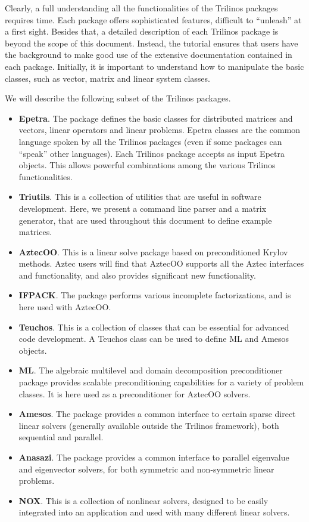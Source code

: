 Clearly, a full understanding all the functionalities of the Trilinos
packages requires time.  Each package offers sophisticated features,
difficult to ``unleash'' at a first sight.  Besides that, a detailed
description of each Trilinos package is beyond the scope of this
document. Instead, the tutorial ensures that users have the background
to make good use of the extensive documentation contained in each
package. Initially, it is important to understand how to manipulate the
basic classes, such as vector, matrix and linear system classes.

\medskip

We will describe the following subset of the Trilinos packages.
\begin{itemize} 
\item {\bf Epetra}. The package defines the basic classes for
  distributed matrices and vectors, linear operators and linear
  problems. Epetra classes are the common language spoken by all the
  Trilinos packages (even if some packages can ``speak'' other
  languages). Each Trilinos package accepts as input Epetra objects.
  This allows powerful combinations among the various Trilinos
  functionalities.
\item {\bf Triutils}. This is a collection of utilities that are useful
  in software development. Here, we present a command line parser and a
  matrix generator, that are used throughout this document to define
  example matrices.
\item {\bf AztecOO}. This is a linear solve package based on
  preconditioned Krylov methods. Aztec users will find that AztecOO
  supports all the Aztec interfaces and functionality, and also provides
  significant new functionality.
\item {\bf IFPACK}. The package performs various incomplete
  factorizations, and is here used with AztecOO.
\item {\bf Teuchos}. This is a collection of classes that can be
  essential for advanced code development. A Teuchos class can be used
  to define ML and Amesos objects.
\item {\bf ML}. The algebraic multilevel and domain decomposition
  preconditioner package provides scalable preconditioning capabilities
  for a variety of problem classes. It is here used as a preconditioner
  for AztecOO solvers.
\item {\bf Amesos}. The package provides a common interface to certain
  sparse direct linear solvers (generally available outside the Trilinos
  framework), both sequential and parallel.
\item {\bf Anasazi}. The package provides a common interface to parallel eigenvalue 
  and eigenvector solvers, for both symmetric and non-symmetric linear problems.
\item {\bf NOX}. This is a collection of nonlinear solvers, designed to
  be easily integrated into an application and used with many different
  linear solvers.
\end{itemize}

